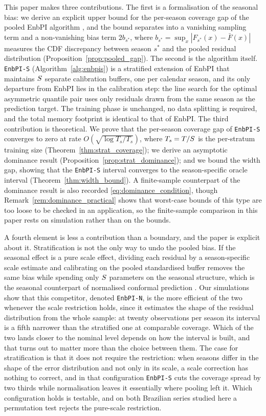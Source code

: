 This paper makes three contributions.  The first is a formalisation
of the seasonal bias: we derive an explicit upper bound for the
per-season coverage gap of the pooled EnbPI algorithm
\citep{xu2023conformal}, and the bound separates into a vanishing
sampling term and a non-vanishing bias term $2b_{s^*}$, where
$b_{s^*} = \sup_x |F_{s^*}(x) - \bar{F}(x)|$ measures the CDF
discrepancy between season $s^*$ and the pooled residual
distribution (Proposition~\ref{prop:pooled_gap}).
The second is the algorithm itself.  \texttt{EnbPI-S}
(Algorithm~\ref{alg:enbpis}) is a stratified extension of EnbPI that
maintains $S$ separate calibration buffers, one per calendar
season, and its only departure from EnbPI lies in the calibration
step: the line search for the optimal asymmetric quantile pair uses
only residuals drawn from the same season as the prediction target.
The training phase is unchanged, no data splitting is required, and
the total memory footprint is identical to that of EnbPI.
The third contribution is theoretical.  We prove that the per-season
coverage gap of \texttt{EnbPI-S} converges to zero at rate
$O(\sqrt{\log T_s / T_s})$, where $T_s = T/S$ is the per-stratum
training size (Theorem~\ref{thm:strat_coverage}); we derive an
asymptotic dominance result (Proposition~\ref{prop:strat_dominance});
and we bound the width gap, showing that the \texttt{EnbPI-S}
interval converges to the season-specific oracle interval
(Theorem~\ref{thm:width_bound}).  A finite-sample counterpart of the
dominance result is also recorded
\eqref{eq:dominance_condition}, though
Remark~\ref{rem:dominance_practical} shows that worst-case bounds of
this type are too loose to be checked in an application, so the
finite-sample comparison in this paper rests on simulation rather
than on the bounds.

A fourth element is less a contribution than a boundary, and the
paper is explicit about it.  Stratification is not the only way to
undo the pooled bias.  If the seasonal effect is a pure scale effect,
dividing each residual by a season-specific scale estimate and
calibrating on the pooled standardised buffer removes the same bias
while spending only $S$ parameters on the seasonal structure,
which is the seasonal counterpart of normalised conformal prediction
\citep{dewolf2025conditional}.  Our simulations show that this
competitor, denoted \texttt{EnbPI-N}, is the more efficient of the two
whenever the scale restriction holds, since it estimates the shape of
the residual distribution from the whole sample: at twenty observations
per season its interval is a fifth narrower than the stratified one at
comparable coverage.  Which of the two lands closer to the nominal
level depends on how the interval is built, and that turns out to
matter more than the choice between them.  The case for stratification is that it does
not require the restriction: when seasons differ in the shape of the
error distribution and not only in its scale, a scale correction has
nothing to correct, and in that configuration \texttt{EnbPI-S} cuts
the coverage spread by two thirds while normalisation leaves it
essentially where pooling left it.  Which configuration holds is
testable, and on both Brazilian series studied here a permutation
test rejects the pure-scale restriction.

